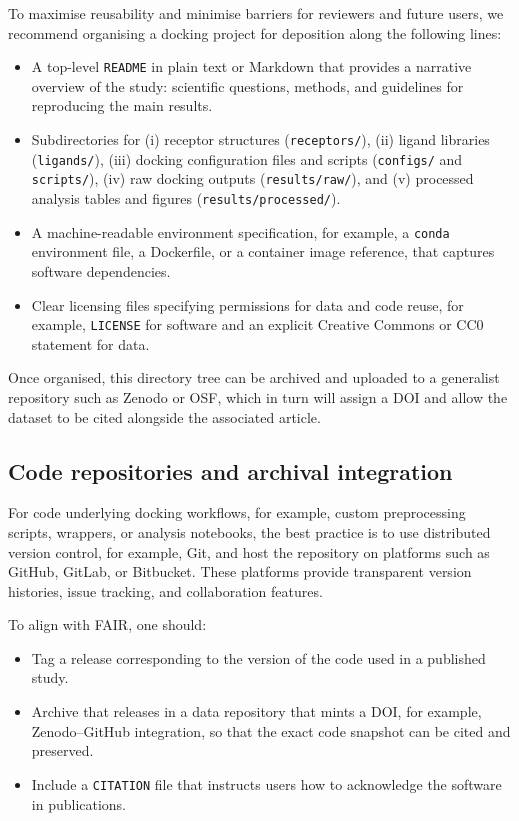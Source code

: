 \documentclass[12pt]{article}
\begin{document}
To maximise reusability and minimise barriers for reviewers and future users, we recommend organising a docking project for deposition along the following lines:

\begin{itemize}
  \item A top-level \texttt{README} in plain text or Markdown that provides a narrative overview of the study: scientific questions, methods, and guidelines for reproducing the main results.
  \item Subdirectories for (i) receptor structures (\texttt{receptors/}), (ii) ligand libraries (\texttt{ligands/}), (iii) docking configuration files and scripts (\texttt{configs/} and \texttt{scripts/}), (iv) raw docking outputs (\texttt{results/raw/}), and (v) processed analysis tables and figures (\texttt{results/processed/}).
  \item A machine-readable environment specification, for example, a \texttt{conda} environment file, a Dockerfile, or a container image reference, that captures software dependencies.
  \item Clear licensing files specifying permissions for data and code reuse, for example, \texttt{LICENSE} for software and an explicit Creative Commons or CC0 statement for data.
\end{itemize}

Once organised, this directory tree can be archived and uploaded to a generalist repository such as Zenodo or OSF, which in turn will assign a DOI and allow the dataset to be cited alongside the associated article\cite{CH12_uTexasRepos,CH12_aguRepos,CH12_snsfRepos}.

\subsection{Code repositories and archival integration}

For code underlying docking workflows, for example, custom preprocessing scripts, wrappers, or analysis notebooks, the best practice is to use distributed version control, for example, Git, and host the repository on platforms such as GitHub, GitLab, or Bitbucket\cite{CH12_gitRepro2013,CH12_tenOpenDev,CH12_tenCleanOSS}. These platforms provide transparent version histories, issue tracking, and collaboration features.

To align with FAIR, one should:

\begin{itemize}
  \item Tag a release corresponding to the version of the code used in a published study.
  \item Archive that releases in a data repository that mints a DOI, for example, Zenodo--GitHub integration, so that the exact code snapshot can be cited and preserved.
  \item Include a \texttt{CITATION} file that instructs users how to acknowledge the software in publications.
\end{itemize}
\end{document}
